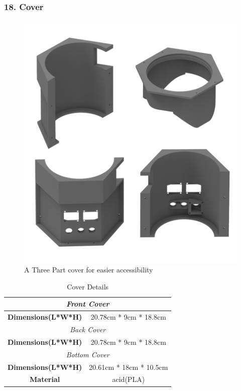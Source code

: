 \documentclass[12pt,a4paper,oneside]{book}
\begin{document}
			\subsubsection*{18. Cover}
				\begin{figure}[H]
					\centering
					\includegraphics[scale=1.2]{COVER FULL}
					\caption{A Three Part cover for easier accessibility}	 
				\end{figure}
				\begin{table}[H]
				\centering
				\def\arraystretch{1.5}
					\caption{Cover Details}
					\vspace{0.5cm}
					\begin{tabular}{|c||c|}
						\hline
						\multicolumn{2}{|c|}{\textit{Front Cover}}\\\hline
						\textbf{Dimensions(L*W*H)} & 20.78cm * 9cm * 18.8cm\\\hline
						\multicolumn{2}{|c|}{\textit{Back Cover}}\\\hline					
						\textbf{Dimensions(L*W*H)} & 20.78cm * 9cm * 18.8cm\\\hline
						\multicolumn{2}{|c|}{\textit{Bottom Cover}}\\\hline				
						\textbf{Dimensions(L*W*H)} & 20.61cm * 18cm * 10.5cm\\\hline
						\textbf{Material} & acid(PLA)\\\hline
					\end{tabular}
				\end{table}
				\pagebreak
			
\end{document}
